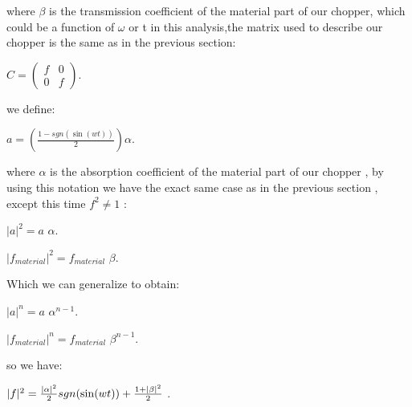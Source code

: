 \documentclass[11pt]{article}
\begin{document}
\vspace{1cm}

where $\beta$ is the transmission coefficient of the material part of our chopper, which could be a function of  $\omega$ or t in this analysis,the matrix used to describe our chopper is the same as in the previous section:

 
\vspace{1cm}

$C=\begin{pmatrix} f & 0 \\ 0 & f \end{pmatrix}$.

\vspace{1 cm}

we define:

\vspace{0.5cm}

$a=\left(\frac{1-sgn(\sin(wt))}{2}\right) \alpha$.
\vspace{0.5cm}

where $\alpha$ is the absorption coefficient of the material part of our chopper , by using this notation we have the exact same case as in the previous section , except this time $f^2 \neq 1$ :

$|a|^2=a$ $\alpha$.

$|f_{material}|^2=f_{material}$ $\beta$.

Which we can generalize to obtain:

$|a|^n=a$ $\alpha^{n-1}$.

$|f_{material}|^n=f_{material}$ $\beta^{n-1}$.

so we have:

$|f|^2=  \frac{\abs{\alpha}^2}{2} sgn(\sin(wt)) +\frac{1+\abs{\beta}^2}{2}$ .

\vspace{0.5cm}
\end{document}
